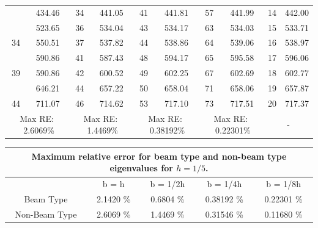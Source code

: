 \documentclass[8pt]{beamer}
\begin{document}
\begin{frame}
\begin{table}[htbp]
{{\begin{tabular}{|cc|cc|cc|cc||cc|}
{                    {30} & 434.46 & {34} & 441.05 & {41} & 441.81 & {57} & 441.99 & 14    & 442.00 \\
                    \rowcolor{lightgray}{31} & 523.65 & {36} & 534.04 & {43} & 534.17 & {63} & 534.03 & 15    & 533.71 \\
                    {34} & 550.51 & {37} & 537.82 & {44} & 538.86 & {64} & 539.06 & 16    & 538.97 \\
                    \rowcolor{lightgray}{37} & 590.86 & {41} & 587.43 & {48} & 594.17 & {65} & 595.58 & 17    & 596.06 \\
                    {39} & 590.86 & {42} & 600.52 & {49} & 602.25 & {67} & 602.69 & 18    & 602.77 \\
                    \rowcolor{lightgray}{42} & 646.21 & {44} & 657.22 & {50} & 658.04 & {71} & 658.06 & 19    & 657.87 \\
                    {44} & 711.07 & {46} & 714.62 & {53} & 717.10 & {73} & 717.51 & 20    & 717.37 \\
                    \hline
                    \hline
                    \multicolumn{2}{|c|}{Max RE: \  2.6069\%} &\multicolumn{2}{c|}{Max RE: \ 1.4469\%}  & \multicolumn{2}{c|}{Max RE: \  0.38192\%}  & \multicolumn{2}{c||}{Max RE: \ 0.22301\%}& \multicolumn{2}{c|}{-} \\
                    \hline
                \end{tabular}%
                \label{tab:2v3_1}%
            }}
        \end{table}%
    \end{frame}

    \begin{frame}
        \begin{table}[htbp]
            \centering
            \begin{tabular}{|c|cccc|}
                \hline
                \multicolumn{5}{|c|}{Maximum relative error for beam type and non-beam type eigenvalues for $h = 1/5$.} \\
                \hline
                \hline
                & {b = h} & {b = 1/2h} & {b = 1/4h} & {b = 1/8h} \\
                \hline
                Beam Type & 2.1420 \% & 0.6804 \% & 0.38192 \% & 0.22301 \% \\
                Non-Beam Type & 2.6069 \% & 1.4469 \% & 0.31546 \% & 0.11680 \% \\
                \hline
            \end{tabular}%
            \label{tab:2Dv3D_1_breakup}%
        \end{table}%
    \end{frame}
\end{document}
